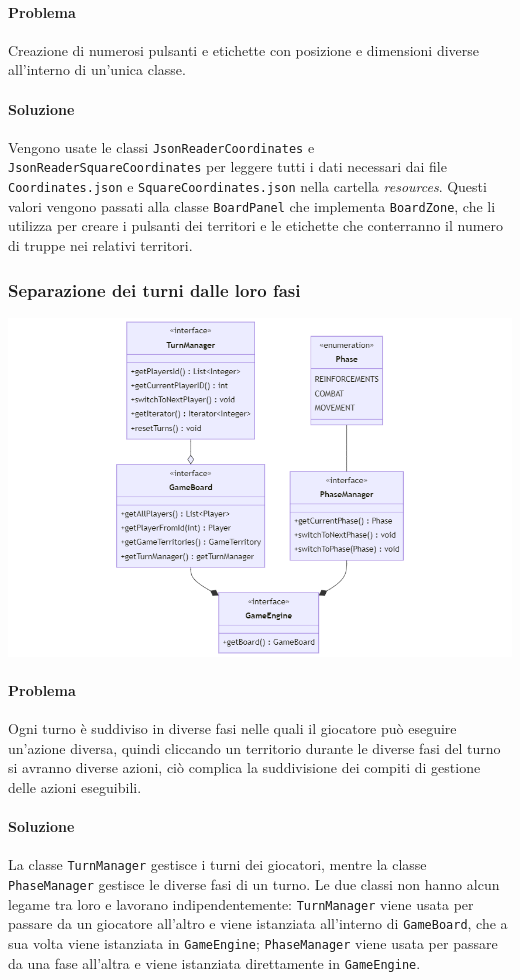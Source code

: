 \documentclass[a4paper,12pt]{report}
\begin{document}
\paragraph*{Problema} Creazione di numerosi pulsanti e etichette con posizione e dimensioni diverse all'interno di un'unica classe.
%
\paragraph*{Soluzione} Vengono usate le classi \texttt{JsonReaderCoordinates} e \linebreak \texttt{JsonReaderSquareCoordinates} per leggere tutti i dati necessari dai file \texttt{Coordinates.json} e \texttt{SquareCoordinates.json} nella cartella \textit{resources}. Questi valori vengono passati alla classe \texttt{BoardPanel} che implementa \texttt{BoardZone}, che li utilizza per creare i pulsanti dei territori e le etichette che conterranno il numero di truppe nei relativi territori.
%
\subsubsection*{Separazione dei turni dalle loro fasi}
%
\includegraphics[width=\textwidth]{img/Turns-Phases.png}
%
\paragraph*{Problema} Ogni turno \`e suddiviso in diverse fasi nelle quali il giocatore pu\`o eseguire un'azione diversa, quindi cliccando un territorio durante le diverse fasi del turno si avranno diverse azioni, ci\`o complica la suddivisione dei compiti di gestione delle azioni eseguibili.
%
\paragraph*{Soluzione}  La classe \texttt{TurnManager} gestisce i turni dei giocatori, mentre la classe \texttt{PhaseManager} gestisce le diverse fasi di un turno. Le due classi non hanno alcun legame tra loro e lavorano indipendentemente: \texttt{TurnManager} viene usata per passare da un giocatore all'altro e viene istanziata all'interno di \texttt{GameBoard}, che a sua volta viene istanziata in \texttt{GameEngine}; \texttt{PhaseManager} viene usata per passare da una fase all'altra e viene istanziata direttamente in \texttt{GameEngine}.
%
\end{document}
